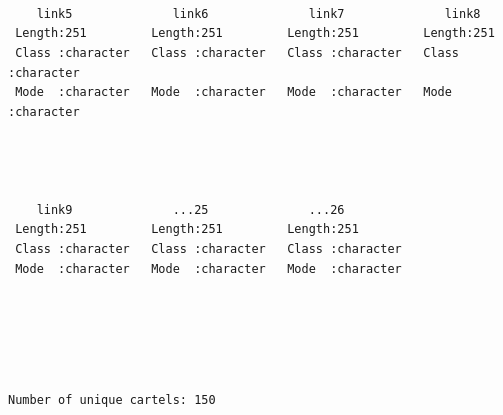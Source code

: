 \documentclass[
]{article}
\newenvironment{Shaded}{\begin{snugshade}}{\end{snugshade}}
\newcommand{\FunctionTok}[1]{\textcolor[rgb]{0.28,0.35,0.67}{#1}}
\newcommand{\NormalTok}[1]{\textcolor[rgb]{0.00,0.23,0.31}{#1}}
\newcommand{\SpecialCharTok}[1]{\textcolor[rgb]{0.37,0.37,0.37}{#1}}
\newcommand{\StringTok}[1]{\textcolor[rgb]{0.13,0.47,0.30}{#1}}
\begin{document}
\begin{verbatim}
                                                                            
                                                                            
                                                                            
    link5              link6              link7              link8          
 Length:251         Length:251         Length:251         Length:251        
 Class :character   Class :character   Class :character   Class :character  
 Mode  :character   Mode  :character   Mode  :character   Mode  :character  
                                                                            
                                                                            
                                                                            
                                                                            
    link9              ...25              ...26          
 Length:251         Length:251         Length:251        
 Class :character   Class :character   Class :character  
 Mode  :character   Mode  :character   Mode  :character  
                                                         
                                                         
                                                         
                                                         
\end{verbatim}

\begin{Shaded}
\end{Shaded}

\begin{verbatim}

Number of unique cartels: 150 
\end{verbatim}

\begin{Shaded}
\end{Shaded}
\end{document}
